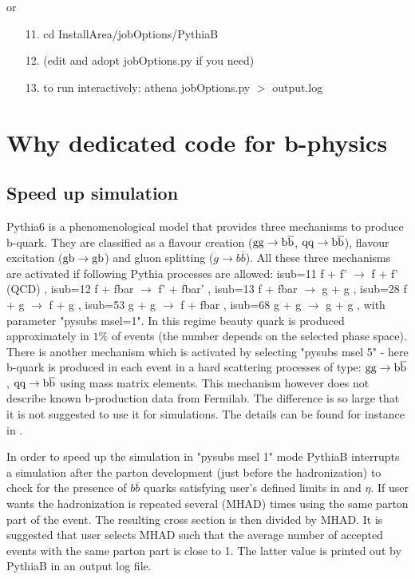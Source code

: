   or
  
  
\begin{itemize}
 \vspace{-3mm}\item[11.] cd InstallArea/jobOptions/PythiaB 
\vspace{-3mm}\item[12.] (edit and adopt jobOptions.py if you need)
\vspace{-3mm}\item[13.] to run interactively: athena jobOptions.py $>$
output.log
 \end{itemize}
 
\section{Why dedicated code for b-physics }

\subsection{Speed up simulation}
Pythia6 is a phenomenological model that provides  three
mechanisms to produce b-quark. They are classified as a flavour
creation ($ \rm gg \rightarrow b \overline{b}$, $ \rm qq
\rightarrow b \overline{b}$), flavour excitation ($\rm gb
\rightarrow gb$) and gluon splitting ($g \rightarrow b
\overline{b}$). All these three mechanisms are activated if
following Pythia processes are allowed:
 isub=11 f + f' $\rightarrow$ f + f' (QCD) ,
 isub=12 f + fbar $\rightarrow$ f' + fbar' ,
 isub=13 f + fbar $\rightarrow$ g + g  ,
 isub=28 f + g $\rightarrow$ f + g   ,
 isub=53 g + g $\rightarrow$ f + fbar ,
 isub=68 g + g $\rightarrow$ g + g ,
  with parameter "pysubs msel=1".
 In this regime beauty quark is
produced approximately in $1\%$ of events (the number depends on
the selected phase space). There is another mechanism which is
activated by selecting "pysubs msel 5" - here b-quark is produced
in each event in a hard scattering processes of type: $ \rm gg
\rightarrow b \overline{b}$, $ \rm qq \rightarrow b \overline{b}$
using mass matrix elements. This mechanism however does not
describe known b-production data from Fermilab. The difference is
so large that it is not suggested to use it for simulations. The
details can be found for instance in \cite{my5}.

In order to speed up the simulation in "pysubs msel 1" mode
PythiaB interrupts a simulation after the parton development (just
before the hadronization) to check for the presence of $b
\overline{b}$ quarks satisfying user's defined limits in \psubt
and $\eta$. If user wants the hadronization is repeated several
(MHAD) times using the same parton part of the event. The
resulting cross section is then divided by MHAD. It is suggested
that user selects MHAD such that the average number of accepted
events with the same parton part is close to 1. The latter value
is printed out by PythiaB in an output log file.


